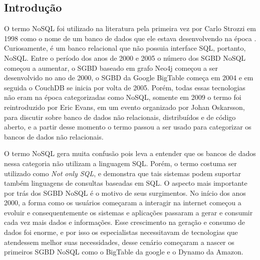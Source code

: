 \subsection{Introdução}
	O termo NoSQL foi utilizado na literatura pela primeira vez por Carlo Strozzi em 1998 como o nome de um banco de dados que ele estava desenvolvendo na época \cite{FirstNoSQL}. Curiosamente, é um banco relacional que não possuia interface SQL, portanto, NoSQL. Entre o período dos anos de 2000 e 2005 o número dos SGBD NoSQL começou a aumentar, o SGBD baseado em grafo Neo4j começou a ser desenvolvido no ano de 2000, o SGBD da Google BigTable\cite{Chang:2008:BDS:1365815.1365816} começa em 2004 e em seguida o CouchDB se inicia por volta de 2005. Porém, todas essas tecnologias não eram na época categorizadas como NoSQL, somente em 2009 o termo foi reintroduzido por Eric Evans, em um evento organizado por Johan Oskarsson, para discutir sobre banco de dados não relacionais, distribuídos e de código aberto, e a partir desse momento o termo passou a ser usado para categorizar os bancos de dados não relacionais.
	
	O termo NoSQL gera muita confusão pois leva a entender que os bancos de dados nessa categoria não utilizam a linguagem SQL. Porém, o termo costuma ser utilizado como \textit{Not only SQL}, e demonstra que tais sistemas podem suportar também linguagens de consultas baseadas em SQL. O aspecto mais importante por trás dos SGBD NoSQL é o motivo de seus surgimentos. No início dos anos 2000, a forma como os usuários começaram a interagir na internet começou a evoluir e consequentemente os sistemas e aplicações passaram a gerar e consumir cada vez mais dados e informações. Esse crescimento na geração e consumo de dados foi enorme, e por isso os especialistas necessitavam de tecnologias que atendessem melhor suas necessidades, desse cenário começaram a nascer os primeiros SGBD NoSQL como o BigTable da google e o Dynamo da Amazon\cite{DeCandia:2007:DAH:1323293.1294281}.
	
